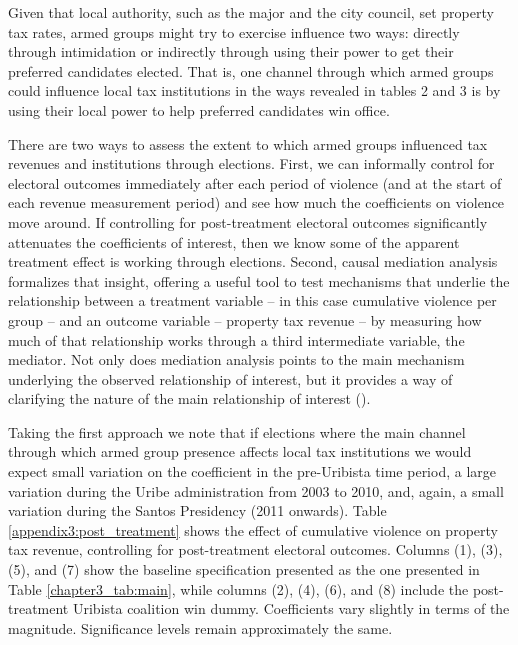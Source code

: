 Given that local authority, such as the major and the city council, set property tax rates, armed groups might try to exercise influence two ways: directly through intimidation or indirectly through using their power to get their preferred candidates elected. That is, one channel through which armed groups could influence local tax institutions in the ways revealed in tables 2 and 3 is by using their local power to help preferred candidates win office.  

There are two ways to assess the extent to which armed groups influenced tax revenues and institutions through elections. First, we can informally control for electoral outcomes immediately after each period of violence (and at the start of each revenue measurement period) and see how much the coefficients on violence move around. If controlling for post-treatment electoral outcomes significantly attenuates the coefficients of interest, then we know some of the apparent treatment effect is working through elections. Second, causal mediation analysis formalizes that insight, offering a useful tool to test mechanisms that underlie the relationship between a treatment variable -- in this case cumulative violence per group -- and an outcome variable -- property tax revenue -- by measuring how much of that relationship works through a third intermediate variable, the mediator. Not only does mediation analysis points to the main mechanism underlying the observed relationship of interest, but it provides a way of clarifying the nature of the main relationship of interest (\citet{imaietal2011}).


Taking the first approach we note that if elections where the main channel through which armed group presence affects local tax institutions we would expect small variation on the coefficient in the pre-Uribista time period, a large variation during the Uribe administration from 2003 to 2010, and, again, a small variation during the Santos Presidency (2011 onwards). Table \ref{appendix3:post_treatment} shows the effect of cumulative violence on property tax revenue, controlling for post-treatment electoral outcomes. Columns (1), (3), (5), and (7) show the baseline specification presented as the one presented in Table \ref{chapter3_tab:main}, while columns (2), (4), (6), and (8) include the post-treatment Uribista coalition win dummy. Coefficients vary slightly in terms of the magnitude. Significance levels remain approximately the same.




